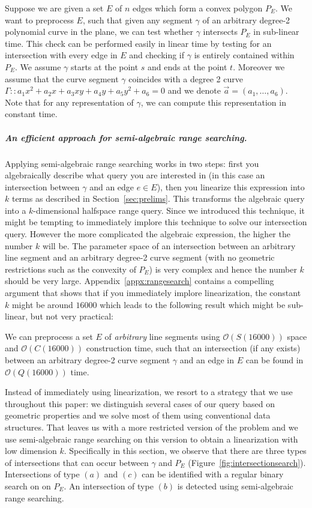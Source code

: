 \documentclass[a4paper, UKenglish]{lipics-v2018}
\begin{document}
Suppose we are given a set $E$ of $n$ edges which form a convex polygon $P_E$. We want to preprocess $E$, such that given any segment $\gamma$ of an arbitrary degree-2 polynomial curve in the plane, we can test whether $\gamma$ intersects $P_E$ in sub-linear time. This check can be performed easily in linear time by testing for an intersection with every edge in $E$ and checking if $\gamma$ is entirely contained within $P_E$. We assume $\gamma$ starts at the point $s$ and ends at the point $t$. Moreover we assume that the curve segment $\gamma$ coincides with a degree 2 curve $\Gamma :: a_1 x^2 + a_2 x + a_3 xy + a_4 y + a_5 y^2 + a_6 = 0$ and we denote $\vec{a} = (a_1, \ldots, a_6)$. Note that for any representation of $\gamma$, we can compute this representation in constant time.

\subparagraph*{An efficient approach for semi-algebraic range searching.}
Applying semi-algebraic range searching works in two steps: first you algebraically describe what query you are interested in (in this case an intersection between $\gamma$ and an edge $e \in E$), then you linearize this expression into $k$ terms as described in Section~\ref{sec:prelims}. This transforms the algebraic query into a $k$-dimensional halfspace range query. Since we introduced this technique, it might be tempting to immediately implore this technique to solve our intersection query. However the more complicated the algebraic expression, the higher the number $k$ will be. The parameter space of an intersection between an arbitrary line segment and an arbitrary degree-2 curve segment (with no geometric restrictions such as the convexity of $P_E$) is very complex and hence the number $k$ should be very large. Appendix~\ref{appx:rangesearch} contains a compelling argument that shows that if you immediately implore linearization, the constant $k$ might be around $16000$ which leads to the following result which might be sub-linear, but not very practical:

\begin{lemma}
We can preprocess a set $E$ of \emph{arbitrary} line segments using $\mathcal{O}(S(16000))$ space and $\mathcal{O}(C(16000))$ construction time, such that an intersection (if any exists) between an arbitrary degree-2 curve segment $\gamma$ and an edge in $E$ can be found in $\mathcal{O}(Q(16000))$ time.
\end{lemma}

 \noindent
Instead of immediately using linearization, we resort to a strategy that we use throughout this paper: we distinguish several cases of our query based on geometric properties and we solve most of them using conventional data structures. That leaves us with a more restricted version of the problem and we use semi-algebraic range searching on this version to obtain a linearization with low dimension $k$. 
Specifically in this section, we observe that there are three types of intersections that can occur between $\gamma$ and $P_E$ (Figure~\ref{fig:intersectionsearch}). Intersections of type $(a)$ and $(c)$ can be identified with a regular binary search on on $P_E$. An intersection of type $(b)$ is detected using semi-algebraic range searching.
\end{document}
